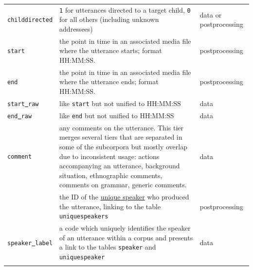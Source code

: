 \documentclass[a4paper, 11pt]{book}
\newcommand{\und}{\underline{{ }}\hspace{0.2mm}}	%
\begin{document}
\begin{longtable}{lp{.5\linewidth}p{.2\linewidth}}
		\texttt{childdirected} & \texttt{1} for utterances directed to a target child, \texttt{0} for all others (including unknown addressees) & data or postprocessing \\
		\texttt{start}			& the point in time in an associated media file where the utterance starts; format HH:MM:SS. & postprocessing \\ 
		\texttt{end}			& the point in time in an associated media file where the utterance ends; format HH:MM:SS. & postprocessing \\
		\texttt{start\und raw} 	& like \texttt{start} but not unified to HH:MM:SS & data \\		
		\texttt{end\und raw}	& like \texttt{end} but not unified to HH:MM:SS & data \\
		\texttt{comment}		& any comments on the utterance. This tier merges several tiers that are separated in some of the subcorpora  but mostly overlap due to inconsistent usage: actions accompanying an utterance, background situation, ethnographic comments, comments on grammar, generic comments. & data \\

					
	\label{tab:Table utterances}
\end{longtable}

\end{document}
